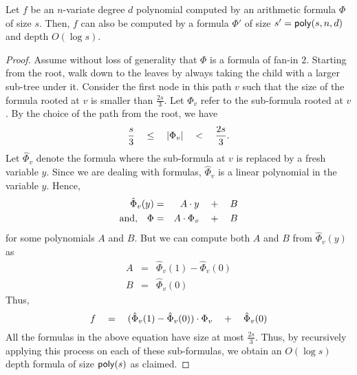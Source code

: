 \begin{lemma}\label{lem:formula-depth-reduction}
Let $f$ be an $n$-variate degree $d$ polynomial computed by an arithmetic formula $\Phi$ of size $s$. Then, $f$ can also be computed by a formula $\Phi'$ of size $s' = \mathsf{poly}(s,n,d)$ and depth $O(\log s)$. 
\end{lemma}
\begin{proof}
Assume without loss of generality that $\Phi$ is a formula of fan-in $2$. Starting from the root, walk down to the leaves by always taking the child with a larger sub-tree under it. Consider the first node in this path $v$ such that the size of the formula rooted at $v$ is smaller than $\frac{2s}{3}$. Let $\Phi_v$ refer to the sub-formula rooted at $v$. By the choice of the path from the root, we have
\[
\frac{s}{3} \quad \leq \quad \left|\Phi_v\right| \quad < \quad \frac{2s}{3}.
\]
Let $\hat{\Phi}_v$ denote the formula where the sub-formula at $v$ is replaced by a fresh variable $y$. Since we are dealing with formulas, $\hat{\Phi}_v$ is a linear polynomial in the variable $y$. Hence,
\begin{eqnarray*}
\hat{\Phi}_v(y) & = & A \cdot y \quad + \quad B\\
\text{and,}\quad \Phi & = & A \cdot \Phi_v \quad + \quad B
\end{eqnarray*}
for some polynomials $A$ and $B$. But we can compute both $A$ and $B$ from $\hat{\Phi}_v(y)$ as
\begin{eqnarray*}
A & = & \hat{\Phi}_v(1) - \hat{\Phi}_v(0)\\
B & = & \hat{\Phi}_v(0)
\end{eqnarray*}
Thus, 
\[
f \quad = \quad (\hat{\Phi}_v(1) - \hat{\Phi}_v(0))\cdot \Phi_v \quad + \quad \hat{\Phi}_v(0)
\]
All the formulas in the above equation have size at most $\frac{2s}{3}$. Thus, by recursively applying this process on each of these sub-formulas, we obtain an $O(\log s)$ depth formula of size $\mathsf{poly}(s)$ as claimed. 
\end{proof}


